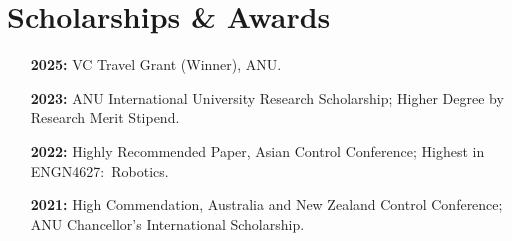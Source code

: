 \section{Scholarships \& Awards}
\begin{enumerate}[leftmargin=30pt,labelsep=0.6em,itemsep=0pt,topsep=0pt]
  \item[\textbf{2025:}] VC Travel Grant (Winner), ANU.
  \item[\textbf{2023:}] ANU International University Research Scholarship; Higher Degree by Research Merit Stipend.
  \item[\textbf{2022:}] Highly Recommended Paper, Asian Control Conference; Highest in ENGN4627:~Robotics.
  \item[\textbf{2021:}] High Commendation, Australia and New Zealand Control Conference; ANU Chancellor's International Scholarship.
\end{enumerate}


